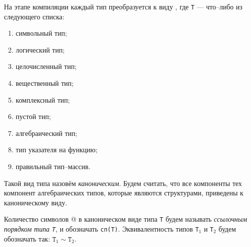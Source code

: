 \documentclass[10pt]{report}
\begin{document}
На этапе компиляции каждый тип преобразуется к виду \textcolor{Green}{}, где \texttt{T} --- что--либо из
следующего списка:
\begin{enumerate}
	\item символьный тип;
	\item логический тип;
	\item целочисленный тип;
	\item вещественный тип;
	\item комплексный тип;
	\item пустой тип;
	\item алгебраический тип;
	\item тип указателя на функцию;
	\item правильный тип--массив.
\end{enumerate}

Такой вид типа назовём \textit{каноническим}. Будем считать, что все компоненты тех компонент алгебраических типов, которые являются структурами, приведены к каноническому виду.

Количество символов @ в каноническом виде типа \texttt{T} будем называть \textit{ссылочным порядком типа \texttt{T}},  и обозначать \texttt{сп(T)}. Эквивалентность типов
\texttt{T$_1$} и \texttt{T$_2$} будем обозначать так: ${\texttt{T}}_1\sim{\texttt{T}}_2$.
\end{document}
